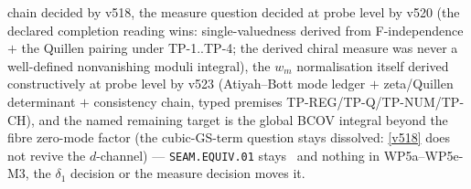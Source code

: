 \documentclass[11pt,a4paper]{article}
\begin{document}
\begin{itemize}
chain decided by v518, the measure question decided at probe level by v520 (the declared
completion reading wins: single-valuedness derived from F-independence $+$ the Quillen pairing
under TP-1..TP-4; the derived chiral measure was never a well-defined nonvanishing moduli
integral), the $w_m$ normalisation itself derived constructively at probe level by v523
(Atiyah--Bott mode ledger $+$ zeta/Quillen determinant $+$ consistency chain, typed premises
TP-REG/TP-Q/TP-NUM/TP-CH), and the named
remaining target is the global BCOV integral beyond the fibre zero-mode factor
(the cubic-GS-term question stays dissolved: \vref{v518}
does not revive the $d$-channel)
--- \texttt{SEAM.EQUIV.01} stays \mO\
and nothing in WP5a--WP5e-M3, the $\delta_1$ decision or the measure decision moves it.
\end{itemize}
\end{document}
